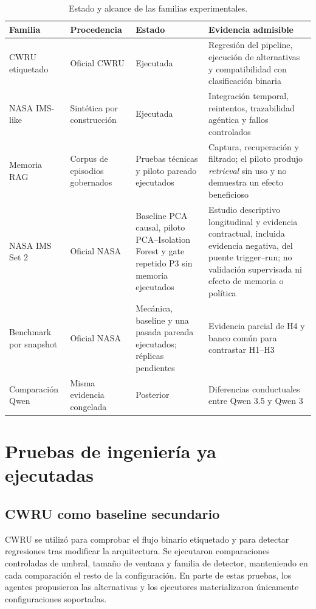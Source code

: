 \begin{table}[htbp]
\centering
\caption{Estado y alcance de las familias experimentales.}\label{tab:estado_familias_experimentales}
\small
\begin{tabularx}{\textwidth}{>{\raggedright\arraybackslash}p{}>{\raggedright\arraybackslash}p{}>{\raggedright\arraybackslash}p{}Y}
\toprule
Familia & Procedencia & Estado & Evidencia admisible \\
\midrule
CWRU etiquetado & Oficial CWRU & Ejecutada & Regresión del pipeline, ejecución de alternativas y compatibilidad con clasificación binaria \\
NASA IMS-like & Sintética por construcción & Ejecutada & Integración temporal, reintentos, trazabilidad agéntica y fallos controlados \\
Memoria RAG & Corpus de episodios gobernados & Pruebas técnicas y piloto
pareado ejecutados & Captura, recuperación y filtrado; el piloto produjo
\emph{retrieval} sin uso y no demuestra un efecto beneficioso \\
NASA IMS Set 2 & Oficial NASA & Baseline PCA causal, piloto PCA--Isolation
Forest y gate repetido P3 sin memoria ejecutados & Estudio descriptivo
longitudinal y evidencia contractual, incluida evidencia negativa, del puente
trigger--run; no validación supervisada ni efecto de memoria o política \\
Benchmark por snapshot & Oficial NASA & Mecánica, baseline y una pasada
pareada ejecutados; réplicas pendientes & Evidencia parcial de H4 y banco común
para contrastar H1--H3 \\
Comparación Qwen & Misma evidencia congelada & Posterior & Diferencias conductuales entre Qwen 3.5 y Qwen 3 \\
\bottomrule
\end{tabularx}
\end{table}

\section{Pruebas de ingeniería ya ejecutadas}

\subsection{CWRU como baseline secundario}

CWRU se utilizó para comprobar el flujo binario etiquetado y para detectar
regresiones tras modificar la arquitectura. Se ejecutaron comparaciones
controladas de umbral, tamaño de ventana y familia de detector, manteniendo en
cada comparación el resto de la configuración. En parte de estas pruebas, los
agentes propusieron las alternativas y los ejecutores materializaron únicamente
configuraciones soportadas.

